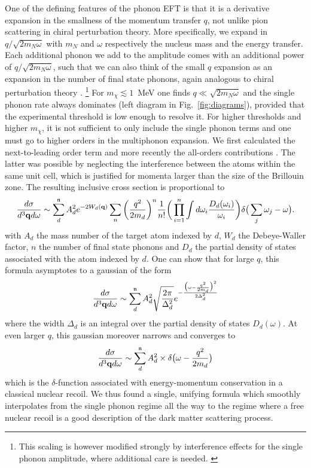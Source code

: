 \documentclass{moriond}
\begin{document}
One of the defining features of the phonon EFT is that it is a derivative expansion in the smallness of the momentum transfer $q$, not unlike pion scattering in chiral perturbation theory. More specifically, we expand in $q/\sqrt{2 m_N \omega}$ with $m_N$ and $\omega$ respectively the nucleus mass and the energy transfer. Each additional phonon we add to the amplitude comes with an additional power of $q/\sqrt{2 m_N \omega}$, such that we can also think of the small $q$ expansion as an expansion in the number of final state phonons, again analogous to chiral perturbation theory \cite{Campbell-Deem:2022fqm}. \footnote{This scaling is however modified strongly by interference effects for the single phonon amplitude, where additional care is needed. \cite{Knapen:2017ekk,Griffin:2018bjn}} For \mbox{$m_\chi\lesssim 1$ MeV} one finds $q\ll \sqrt{2 m_N \omega}$ and the single phonon rate always dominates (left diagram in Fig.~\ref{fig:diagrams}), provided that the experimental threshold is low enough to resolve it. For higher thresholds and higher $m_\chi$, it is not sufficient to only include the single phonon terms and one must go to higher orders in the multiphonon expansion. We first calculated the next-to-leading order term \cite{Campbell-Deem:2019hdx} and more recently the all-orders contributions \cite{Campbell-Deem:2022fqm}. The latter was possible by neglecting the interference between the atoms within the same unit cell, which is justified for momenta larger than the size of the Brillouin zone. The resulting inclusive cross section is proportional to
\begin{equation}
\frac{d \sigma}{d^3 {\bf q} d\omega} \sim \sum_{d}^{\mathfrak{n}} A_d^2   e^{-2 W_d(\mathbf{q})}\sum_n   \bigg(\frac{q^2}{2 m_d} \bigg)^n  \frac{1}{n!} \bigg(\prod_{i=1}^n \int d \omega_{i} \frac{D_d(\omega_i)}{\omega_i} \bigg) \delta \big(\sum_j \omega_j - \omega \big).
\end{equation}
with $A_d$ the mass number of the target atom indexed by $d$, $W_d$ the Debeye-Waller factor, $n$ the number of final state phonons and $D_d$ the partial density of states associated with the atom indexed by $d$. One can show that for large $q$, this formula asymptotes to a gaussian of the form
\begin{equation}
\frac{d \sigma}{d^3 {\bf q} d\omega} \sim \sum_d^{\mathfrak{n}} A_d^2 \sqrt{\frac{2 \pi}{\Delta_d^2}} e^{- \frac{ \big(\omega - \frac{q^2}{2m_d} \big)^2}{2 \Delta_d^2}}
\end{equation}
where the width $\Delta_d$ is an integral over the partial density of states $D_d(\omega)$. At even larger $q$, this gaussian moreover narrows and converges to 
\begin{equation}
\frac{d \sigma}{d^3 {\bf q} d\omega} \sim \sum_d^{\mathfrak{n}} A_d^2 \times \delta\big(  \omega - \frac{q^2}{2m_d} \big)
\end{equation}
which is the $\delta$-function associated with energy-momentum conservation in a classical nuclear recoil. We thus found a single, unifying formula which smoothly interpolates from the single phonon regime all the way to the regime where a free nuclear recoil is a good description of the dark matter scattering process.
\end{document}
